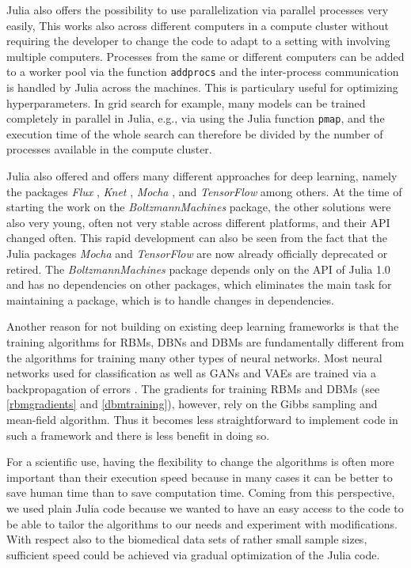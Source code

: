 \documentclass[12pt]{article}
\newcommand{\inlinecode}[1]{\texttt{#1}}
\newcommand{\apkg}[1]{\emph{#1}}
\begin{document}
Julia also offers the possibility to use parallelization via parallel processes very easily, This works also across different computers in a compute cluster without requiring the developer to change the code to adapt to a setting with involving multiple computers.
Processes from the same or different computers can be added to a worker pool via the function \inlinecode{addprocs} and the inter-process communication is handled by Julia across the machines.
This is particulary useful for optimizing hyperparameters.
In grid search \citep{bergstra_algorithms_2011} for example, many models can be trained completely in parallel in Julia, e.g., via using the Julia function  \inlinecode{pmap}, and the execution time of the whole search can therefore be divided by the number of processes available in the compute cluster.

Julia also offered and offers many different approaches for deep learning, namely the packages \apkg{Flux} \citep{flux}, \apkg{Knet} \citep{knetjl}, \apkg{Mocha} \citep{mochajl}, and \apkg{TensorFlow} \citep{tensorflowjl} among others.
At the time of starting the work on the \apkg{BoltzmannMachines} package, the other solutions were also very young, often not very stable across different platforms, and their API changed often.
This rapid development can also be seen from the fact that the Julia packages \apkg{Mocha} and \apkg{TensorFlow} are now already officially deprecated or retired.
The \apkg{BoltzmannMachines} package depends only on the API of Julia 1.0 and has no dependencies on other packages, which eliminates the main task for maintaining a package, which is to handle changes in dependencies.

Another reason for not building on existing deep learning frameworks is that the training algorithms for RBMs, DBNs and DBMs are fundamentally different from the algorithms for training many other types of neural networks.
Most neural networks used for classification as well as GANs and VAEs are trained via a backpropagation of errors \citep{backpropagation}.
The gradients for training RBMs and DBMs (see \ref{rbmgradients} and \ref{dbmtraining}), however, rely on the Gibbs sampling and mean-field algorithm.
Thus it becomes less straightforward to implement code in such a framework and there is less benefit in doing so.
 
For a scientific use, having the flexibility to change the algorithms is often more important than their execution speed because in many cases it can be better to save human time than to save computation time. 
Coming from this perspective, we used plain Julia code because we wanted to have an easy access to the code to be able to tailor the algorithms to our needs and experiment with modifications.
With respect also to the biomedical data sets of rather small sample sizes, sufficient speed could be achieved via gradual optimization of the Julia code.
\end{document}

